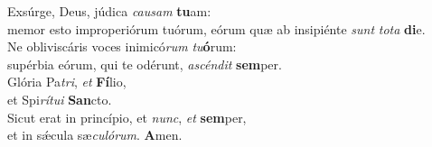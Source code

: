 \oddverse Exsúrge, Deus, júdica \textit{cau}\textit{sam} \textbf{tu}am:~\*\\
\oddverse memor esto improperiórum tuórum, eórum quæ ab insipiénte \textit{sunt} \textit{to}\textit{ta} \textbf{di}e.\\
\evenverse Ne obliviscáris voces inimicó\textit{rum} \textit{tu}\textbf{ó}rum:~\*\\
\evenverse supérbia eórum, qui te odérunt, \textit{a}\textit{scén}\textit{dit} \textbf{sem}per.\\
\oddverse Glória Pa\textit{tri}, \textit{et} \textbf{Fí}lio,~\*\\
\oddverse et Spi\textit{rí}\textit{tu}\textit{i} \textbf{San}cto.\\
\evenverse Sicut erat in princípio, et \textit{nunc}, \textit{et} \textbf{sem}per,~\*\\
\evenverse et in sǽcula sæ\textit{cu}\textit{ló}\textit{rum}. \textbf{A}men.\\
